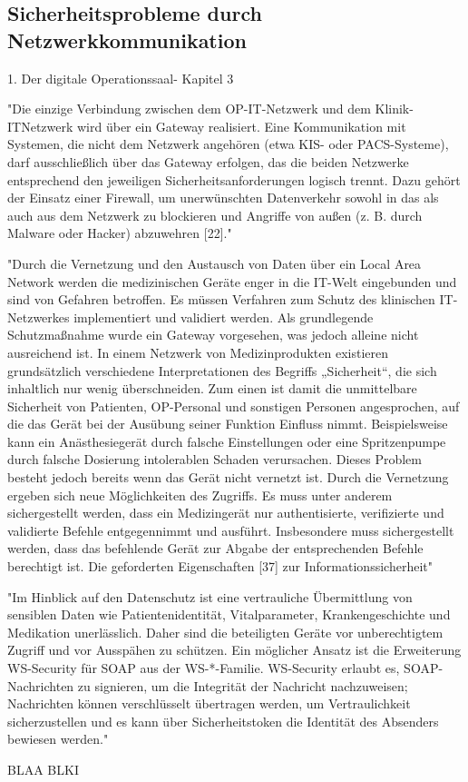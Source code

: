 \subsection{Sicherheitsprobleme durch Netzwerkkommunikation}
1. Der digitale Operationssaal- Kapitel 3

	"Die einzige Verbindung zwischen dem OP-IT-Netzwerk und dem Klinik-ITNetzwerk
	wird über ein Gateway realisiert. Eine Kommunikation mit Systemen, die
	nicht dem Netzwerk angehören (etwa KIS- oder PACS-Systeme), darf ausschließlich
	über das Gateway erfolgen, das die beiden Netzwerke entsprechend den jeweiligen
	Sicherheitsanforderungen logisch trennt. Dazu gehört der Einsatz einer Firewall, um
	unerwünschten Datenverkehr sowohl in das als auch aus dem Netzwerk zu blockieren
	und Angriffe von außen (z. B. durch Malware oder Hacker) abzuwehren [22]."
	
	"Durch die Vernetzung und den Austausch von Daten über ein Local Area Network
	werden die medizinischen Geräte enger in die IT-Welt eingebunden und sind von
	Gefahren betroffen. Es müssen Verfahren zum Schutz des klinischen IT-Netzwerkes
	implementiert und validiert werden. Als grundlegende Schutzmaßnahme wurde ein
	Gateway vorgesehen, was jedoch alleine nicht ausreichend ist. In einem Netzwerk von
	Medizinprodukten existieren grundsätzlich verschiedene Interpretationen des Begriffs
	„Sicherheit“, die sich inhaltlich nur wenig überschneiden. Zum einen ist damit die
	unmittelbare Sicherheit von Patienten, OP-Personal und sonstigen Personen angesprochen,
	auf die das Gerät bei der Ausübung seiner Funktion Einfluss nimmt. Beispielsweise
	kann ein Anästhesiegerät durch falsche Einstellungen oder eine Spritzenpumpe
	durch falsche Dosierung intolerablen Schaden verursachen. Dieses Problem besteht
	jedoch bereits wenn das Gerät nicht vernetzt ist. Durch die Vernetzung ergeben sich
	neue Möglichkeiten des Zugriffs. Es muss unter anderem sichergestellt werden, dass
	ein Medizingerät nur authentisierte, verifizierte und validierte Befehle entgegennimmt
	und ausführt. Insbesondere muss sichergestellt werden, dass das befehlende Gerät zur
	Abgabe der entsprechenden Befehle berechtigt ist.
	Die geforderten Eigenschaften [37] zur Informationssicherheit"
	
	"Im Hinblick auf den Datenschutz ist eine vertrauliche
	Übermittlung von sensiblen Daten wie Patientenidentität, Vitalparameter,
	Krankengeschichte und Medikation unerlässlich. Daher sind die beteiligten Geräte
	vor unberechtigtem Zugriff und vor Ausspähen zu schützen. Ein möglicher Ansatz ist
	die Erweiterung WS-Security für SOAP aus der WS-*-Familie. WS-Security erlaubt es,
	SOAP-Nachrichten zu signieren, um die Integrität der Nachricht nachzuweisen; Nachrichten
	können verschlüsselt übertragen werden, um Vertraulichkeit sicherzustellen
	und es kann über Sicherheitstoken die Identität des Absenders bewiesen werden."
	
	BLAA BLKI